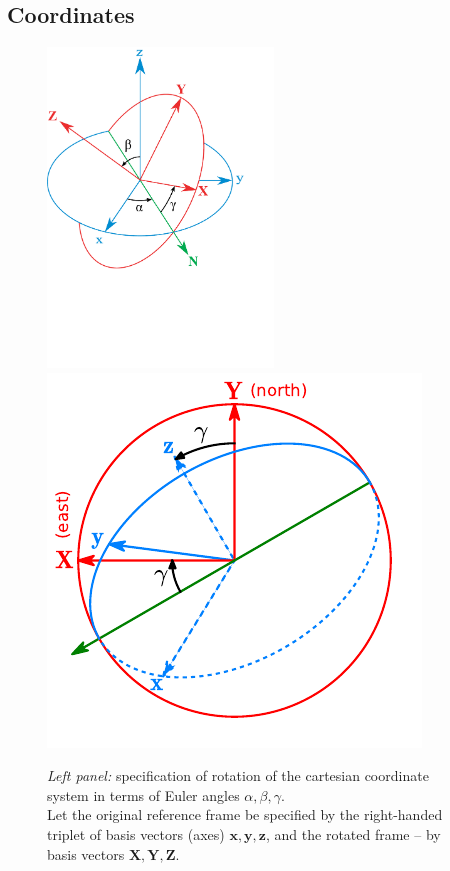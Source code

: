\documentclass[12pt]{article}
\newcommand{\bx}{\boldsymbol{x}}
\newcommand{\by}{\boldsymbol{y}}
\newcommand{\bz}{\boldsymbol{z}}
\newcommand{\bX}{\boldsymbol{X}}
\newcommand{\bY}{\boldsymbol{Y}}
\newcommand{\bZ}{\boldsymbol{Z}}
\begin{document}
\subsection{Coordinates}  \label{sec:CoordinateDetails}

\begin{figure}
\begin{center}
\includegraphics[width=6cm]{EulerAngles.pdf} \hspace{1cm}
\includegraphics{EulerAnglesProjection.pdf}
\end{center}
\caption{\textit{Left panel:} specification of rotation of the cartesian coordinate system in terms of Euler angles $\alpha,\beta,\gamma$.\protect\\
Let the original reference frame be specified by the right-handed triplet of basis vectors (axes) $\bx,\by,\bz$, and the rotated frame -- by basis vectors $\bX,\bY,\bZ$.
}
\end{figure}
\end{document}
